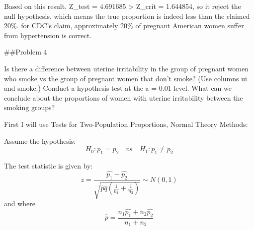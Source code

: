 \documentclass[
]{article}
\begin{document}
Based on this result, \textbar Z\_test\textbar{} = 4.691685
\textgreater{} Z\_crit = 1.644854, so it reject the null hypothesis,
which means the true proportion is indeed less than the claimed 20\%.
for CDC's claim, approximately 20\% of pregnant American women suffer
from hypertension is correct.

\#\#Problem 4

Is there a difference between uterine irritability in the group of
pregnant women who smoke vs the group of pregnant women that don't
smoke? (Use columns ui and smoke.) Conduct a hypothesis test at the a =
0.01 level. What can we conclude about the proportions of women with
uterine irritability between the smoking groups?

First I will use Tests for Two-Population Proportions, Normal Theory
Methods:

Assume the hypothesis:
\[H_0 : p_1 = p_2 \quad vs \quad H_1 : p_1 \ne p_2\]

The test statistic is given by:
\[z = {\frac{\hat{p_1} - \hat{p_2}}{\sqrt{\hat{p}\hat{q}(\frac{1}{n_1}+\frac{1}{n_2})}}}\sim N(0,1)\]
and where \[\hat{p} = \frac{n_1\hat{p_1}+n_2\hat{p_2}}{n_1+n_2}\]
\end{document}
